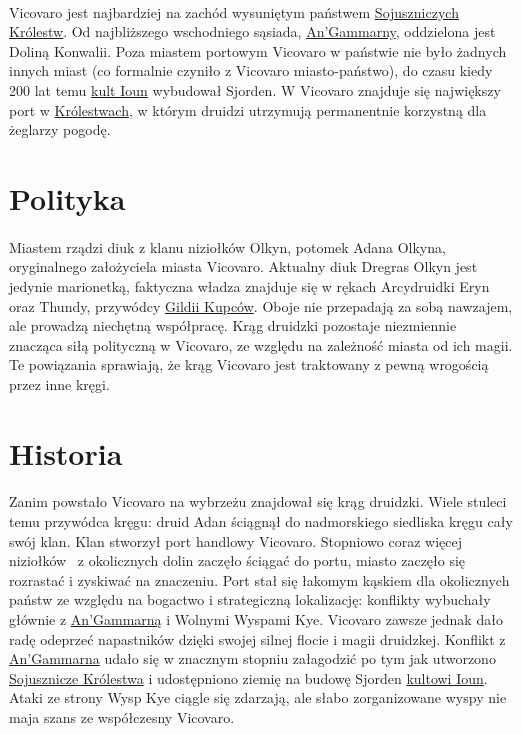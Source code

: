 \paragraph{}
Vicovaro jest najbardziej na zachód wysuniętym państwem \hyperref[SojuszniczeKrolestwa]{Sojuszniczych Królestw}.
Od najbliższego wschodniego sąsiada, \hyperref[AnGammarna]{An'Gammarny}, oddzielona jest Doliną Konwalii. 
Poza miastem portowym Vicovaro w państwie nie było żadnych innych miast (co formalnie czyniło z Vicovaro miasto-państwo), do czasu kiedy 200 lat temu \hyperref[KultIoun]{kult Ioun} wybudował Sjorden. 
W Vicovaro znajduje się największy port w \hyperref[SojuszniczeKrolestwa]{Królestwach}, w którym druidzi utrzymują permanentnie korzystną dla żeglarzy pogodę.

\section{Polityka}
\paragraph{}
Miastem rządzi diuk z klanu niziołków Olkyn, potomek Adana Olkyna, oryginalnego założyciela miasta Vicovaro. 
Aktualny diuk Dregras Olkyn jest jedynie marionetką, faktyczna władza znajduje się w rękach Arcydruidki Eryn oraz Thundy, przywódcy \hyperref[GildiaKupcow]{Gildii Kupców}.
Oboje nie przepadają za sobą nawzajem, ale prowadzą niechętną współpracę. 
Krąg druidzki pozostaje niezmiennie znacząca siłą polityczną w Vicovaro, ze względu na zależność miasta od ich magii. 
Te powiązania sprawiają, że krąg Vicovaro jest traktowany z pewną wrogością przez inne kręgi.

\section{Historia}
\paragraph{}
Zanim powstało Vicovaro na wybrzeżu znajdował się krąg druidzki. 
Wiele stuleci temu przywódca kręgu: druid Adan ściągnął do nadmorskiego siedliska kręgu cały swój klan. 
Klan stworzył port handlowy Vicovaro. 
Stopniowo coraz więcej niziołków  z okolicznych dolin zaczęło ściągać do portu, miasto zaczęło się rozrastać i zyskiwać na znaczeniu.
Port stał się łakomym kąskiem dla okolicznych państw ze względu na bogactwo i strategiczną lokalizację: konflikty wybuchały głównie z \hyperref[AnGammarna]{An'Gammarną} i Wolnymi Wyspami Kye. 
Vicovaro zawsze jednak dało radę odeprzeć napastników dzięki swojej silnej flocie i magii druidzkej. 
Konflikt z \hyperref[AnGammarna]{An'Gammarna} udało się w znacznym stopniu załagodzić po tym jak utworzono \hyperref[SojuszniczeKrolestwa]{Sojusznicze Królestwa} i udostępniono ziemię na budowę Sjorden \hyperref[KultIoun]{kultowi Ioun}.
Ataki ze strony Wysp Kye ciągle się zdarzają, ale słabo zorganizowane wyspy nie maja szans ze współczesny Vicovaro.

